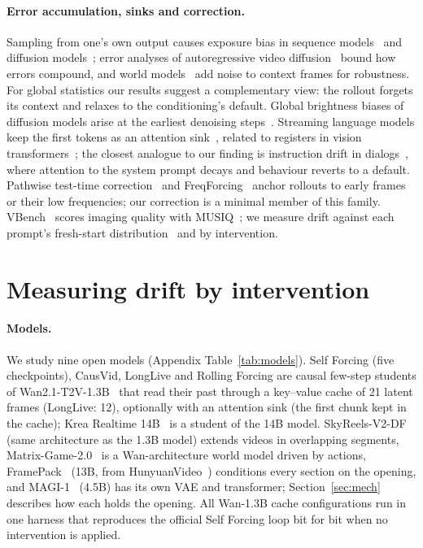 \documentclass[10pt]{article}
\begin{document}
\paragraph{Error accumulation, sinks and correction.} Sampling from one's own output causes exposure bias in sequence
models~\cite{scheduledsampling,dagger} and diffusion models~\cite{ning2023,ning2024}; error analyses of autoregressive
video diffusion~\cite{metaarvdm} bound how errors compound, and world models~\cite{gamengen,diamond,vista,matrixgame2}
add noise to context frames for robustness. For global statistics our results suggest a complementary view: the rollout
forgets its context and relaxes to the conditioning's default. Global brightness biases of diffusion models arise at the
earliest denoising steps~\cite{lin2024,offsetnoise}. Streaming language models keep the first tokens as an attention
sink~\cite{streamingllm,sinkemerge}, related to registers in vision transformers~\cite{registers}; the closest analogue
to our finding is instruction drift in dialogs~\cite{instructiondrift}, where attention to the system prompt decays and
behaviour reverts to a default. Pathwise test-time correction~\cite{pathwise} and FreqForcing~\cite{freqforcing} anchor
rollouts to early frames or their low frequencies; our correction is a minimal member of this family. VBench~\cite{vbench}
scores imaging quality with MUSIQ~\cite{musiq}; we measure drift against each prompt's fresh-start
distribution~\cite{dinov2} and by intervention.

\section{Measuring drift by intervention}\label{sec:protocol}
\paragraph{Models.} We study nine open models (Appendix Table~\ref{tab:models}). Self Forcing (five checkpoints),
CausVid, LongLive and Rolling Forcing are causal few-step students of Wan2.1-T2V-1.3B~\cite{wan} that read their past
through a key--value cache of 21 latent frames (LongLive: 12), optionally with an attention sink (the first chunk kept
in the cache); Krea Realtime 14B~\cite{krea} is a student of the 14B model. SkyReels-V2-DF~\cite{skyreels} (same
architecture as the 1.3B model) extends videos in overlapping segments, Matrix-Game-2.0~\cite{matrixgame2} is a
Wan-architecture world model driven by actions, FramePack~\cite{framepack} (13B, from HunyuanVideo~\cite{hunyuan})
conditions every section on the opening, and MAGI-1~\cite{magi} (4.5B) has its own VAE and transformer;
Section~\ref{sec:mech} describes how each holds the opening. All Wan-1.3B cache configurations run in one harness that
reproduces the official Self Forcing loop bit for bit when no intervention is applied.
\end{document}

